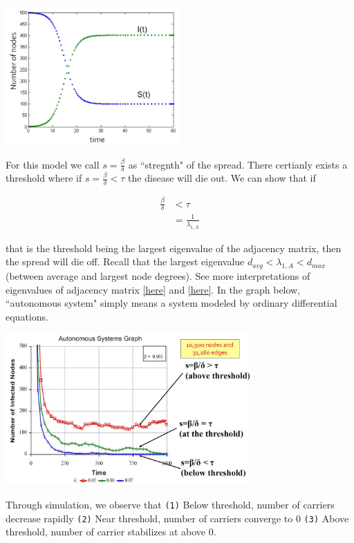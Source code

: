 {
\centering
\includegraphics[width=0.5\textwidth]{notes/img/l13_p22_sis.JPG} \par
}

For this model we call $s = \frac{\beta}{\delta}$ as ``stregnth" of the spread. There certianly exists a threshold where if $s = \frac{\beta}{\delta} < \tau$ the disease will die out. We can show that if 

\begin{align}
    \frac{\beta}{\delta} &< \tau \\
                         &= \frac{1}{\lambda_{1, A}}
\end{align}{}

that is the threshold being the largest eigenvalue of the adjacency matrix, then the spread will die off. Recall that the largest eigenvalue $d_{avg} < \lambda_{1, A} < d_{max}$ (between average and largest node degrees). See more interpretations of eigenvalues of adjacency matrix \href{https://arxiv.org/pdf/1603.03960.pdf}{[here]} and \href{https://www.cs.yale.edu/homes/spielman/561/2012/lect03-12.pdf}{[here]}. In the graph below, ``autonomous system" simply means a system modeled by ordinary differential equations.

{
\centering
\includegraphics[width=0.7\textwidth]{notes/img/l13_p25_threshold.JPG} \par
}

Through simulation, we observe that \texttt{(1)} Below threshold, number of carriers decrease rapidly \texttt{(2)} Near threshold, number of carriers converge to $0$ \texttt{(3)} Above threshold, number of carrier stabilizes at above $0$.

